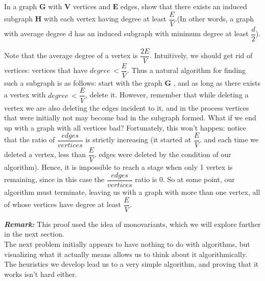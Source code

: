 \documentclass[a4paper,11pt]{book}
\begin{document}
\begin{example}
In a graph \textbf{G}  with \textbf{V} vertices and \textbf{E} edges, show that there exists an induced subgraph \textbf{H} with each vertex having degree at least  $\dfrac{E}{V}$.(In other words, a graph with average degree d has an induced subgraph with minimum degree at least $\dfrac{d}{2}$).
\end{example}
\begin{soln}
Note that the average degree of a vertex is $\dfrac{2E}{V}$. Intuitively, we should get rid of  vertices: vertices that have $degree\,<  \dfrac{E}{V}$. Thus a natural algorithm for finding such a subgraph is as follows: start with the graph \textbf{G} , and as long as there exists a vertex with $degree\,<  \dfrac{E}{V}$, delete it. However, remember that while deleting a vertex we are also deleting the edges incident to it, and in the process vertices that were initially not  may become bad in the subgraph formed. What if we end up with a graph with all  vertices bad? Fortunately, this won’t happen: notice that the ratio of $\dfrac{edges}{vertices}$ is strictly increasing (it started at $\dfrac{E}{V}$. and each time we deleted a vertex, less than $\dfrac{E}{V}$. edges were deleted by the condition of our algorithm). Hence, it is impossible to reach a stage when only 1 vertex is remaining, since in this case the
$\dfrac{edges}{vertices}$ ratio is 0. So at some point, our algorithm must terminate, leaving us with a graph with more than one vertex, all of whose vertices have degree at least $\dfrac{E}{V}$. 
\end{soln}

\textbf{ \textit{Remark:}} This proof used the idea of monovariants, which we will explore further in the next section. \\

The next problem initially appears to have nothing to do with algorithms, but visualizing what it actually means allows us to think about it algorithmically. The heuristics we develop lead us to a very simple algorithm, and proving that it works isn’t hard either.
\end{document}
